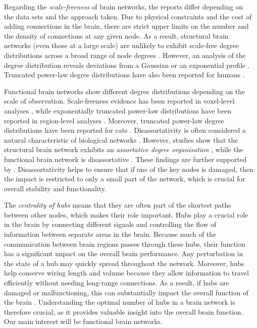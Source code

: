 \documentclass[11pt]{article}
\numberwithin{equation}{section}
\begin{document}
Regarding the \emph{scale-freeness} of brain networks, the reports differ depending on the data sets and the approach taken. Due to physical constraints and the cost of adding connections in the brain, there are strict upper limits on the number and the density of connections at any given node. As a result, structural brain networks (even those at a large scale) are unlikely to exhibit scale-free degree distributions across a broad range of node degrees \cite{Amaral2000, Sporns2011}. However, an analysis of the degree distribution reveals deviations from a Gaussian or an exponential profile \cite{Sporns2011}. Truncated power-law degree distributions have also been reported for humans \cite{55}.

Functional brain networks show different degree distributions depending on the scale of observation. Scale-freeness evidence has been reported in voxel-level analyses \cite{69,91}, while exponentially truncated power-law distributions have been reported in region-level analyses \cite{70,81}. Moreover, truncated power-law degree distributions have been reported for cats \cite{86}. Disassortativity is often considered a natural characteristic of biological networks \cite{Newman2003}. However, studies show that the structural brain network exhibits an \emph{assortative degree organisation} \cite{Hagmann2008, Braun2012}, while the functional brain network is disassortative \cite{Bettencourt2007}. These findings are further supported by \cite{Lim2019}. Disassortativity helps to ensure that if one of the key nodes is damaged, then the impact is restricted to only a small part of the network, which is crucial for overall stability and functionality.

The \emph{centrality of hubs} means that they are often part of the shortest paths between other nodes, which makes their role important. Hubs play a crucial role in the brain by connecting different signals and controlling the flow of information between separate areas in the brain. Because much of the communication between brain regions passes through these hubs, their function has a significant impact on the overall brain performance. Any perturbation in the state of a hub may quickly spread throughout the network. Moreover, hubs help conserve wiring length and volume because they allow information to travel efficiently without needing long-range connections. As a result, if hubs are damaged or malfunctioning, this can substantially impact the overall function of the brain \cite{Sporns2011}. Understanding the optimal number of hubs in a brain network is therefore crucial, as it provides valuable insight into the overall brain function. Our main interest will be functional brain networks.
\end{document}
